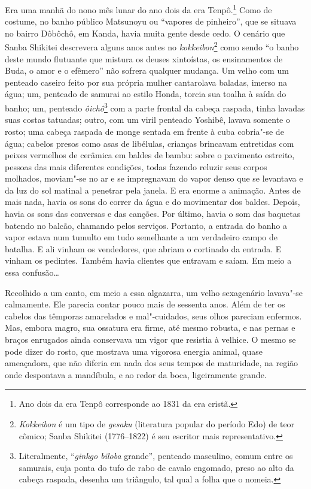 \noindent{}Era uma manhã do nono mês lunar do ano dois da 
era Tenpô.\footnote{ Ano dois da era Tenpô corresponde ao 1831 da era cristã.} Como de costume, no banho
público Matsunoyu ou ``vapores de pinheiro'', que se situava no bairro
Dôbôchô, em Kanda, havia muita gente desde cedo. O cenário que Sanba Shikitei   
descrevera alguns anos antes no \textit{kokkeibon}\footnote{\textit{Kokkeibon} é um 
tipo de \textit{gesaku} (literatura popular do período Edo) de teor cômico; Sanba Shikitei (1776--1822) é
seu escritor mais representativo.} como sendo ``o banho deste
mundo flutuante que mistura os deuses xintoístas, os ensinamentos de
Buda, o amor e o efêmero'' não sofrera qualquer mudança. Um velho com um
penteado caseiro feito por sua própria mulher cantarolava baladas,
imerso na água; um, penteado de samurai ao estilo Honda, torcia sua
toalha à saída do banho; um, penteado \textit{ôichô}\footnote{ Literalmente, 
``\textit{ginkgo biloba} grande'', penteado masculino, comum entre 
os samurais, cuja ponta do tufo de rabo de cavalo engomado, preso ao alto da cabeça raspada, 
desenha um triângulo, tal qual a folha que o nomeia.} com a
parte frontal da cabeça raspada, tinha lavadas suas costas tatuadas; outro, 
com um viril penteado Yoshibê, lavava somente o rosto; uma cabeça raspada de
monge sentada em frente à cuba cobria"-se de água; cabelos presos como
asas de libélulas, crianças brincavam entretidas com peixes vermelhos
de cerâmica em baldes de bambu: sobre o pavimento estreito, pessoas das
mais diferentes condições, todas fazendo reluzir seus corpos molhados,
moviam"-se no ar e se impregnavam do vapor denso que se levantava e da
luz do sol matinal a penetrar pela janela. E era enorme a animação.
Antes de mais nada, havia os sons do correr da água e do movimentar dos
baldes. Depois, havia os sons das conversas e das canções. Por último,
havia o som das baquetas batendo no balcão, chamando pelos serviços.
Portanto, a entrada do banho a vapor estava num tumulto em tudo 
semelhante a um verdadeiro campo de batalha. E ali vinham os vendedores, que
abriam o cortinado da entrada. E vinham os pedintes. Também havia
clientes que entravam e saíam. Em meio a essa confusão\ldots{}

Recolhido a um canto, em meio a essa algazarra, um velho sexagenário
lavava"-se calmamente. Ele parecia contar pouco mais de sessenta anos.
Além de ter os cabelos das têmporas amarelados e mal"-cuidados, seus
olhos pareciam enfermos. Mas, embora magro, sua ossatura era firme, até
mesmo robusta, e nas pernas e braços enrugados ainda conservava um
vigor que resistia à velhice. O mesmo se pode dizer do rosto, que
mostrava uma vigorosa energia animal, quase ameaçadora, que não diferia
em nada dos seus tempos de maturidade, na região onde despontava a mandíbula, 
e ao redor da boca, ligeiramente grande.

